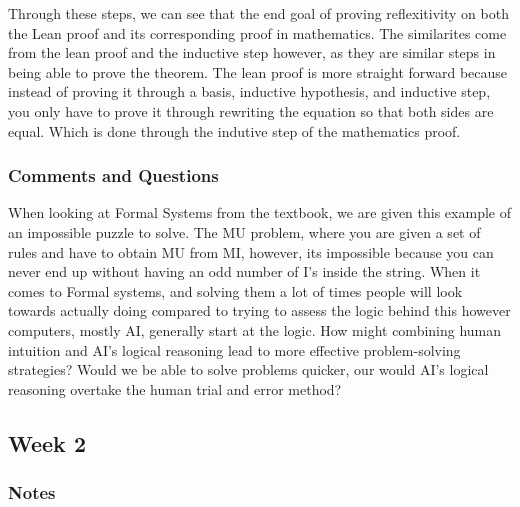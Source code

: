 \documentclass{article}
\theoremstyle{theorem}
\theoremstyle{definition}
\theoremstyle{remark}
\begin{document}
Through these steps, we can see that the end goal of proving reflexitivity on both the Lean proof and its corresponding proof in mathematics. The similarites come from the lean proof and the inductive step however,
as they are similar steps in being able to prove the theorem. The lean proof is more straight forward because instead of proving it through a basis, inductive hypothesis, and inductive step, you only have to prove
it through rewriting the equation so that both sides are equal. Which is done through the indutive step of the mathematics proof. 

\subsubsection{Comments and Questions}

When looking at Formal Systems from the textbook, we are given this example of an impossible puzzle to solve. 
The MU problem, where you are given a set of rules and have to obtain MU from MI, however, its impossible because you can never end up without 
having an odd number of I's inside the string. When it comes to Formal systems, and solving them a lot of times people will look towards actually doing 
compared to trying to assess the logic behind this however computers, mostly AI, generally start at the logic. How might combining human intuition and AI's 
logical reasoning lead to more effective problem-solving strategies? Would we be able to solve problems quicker, our would AI's logical reasoning overtake the 
human trial and error method?

\subsection{Week 2}

\subsubsection{Notes}
\end{document}
